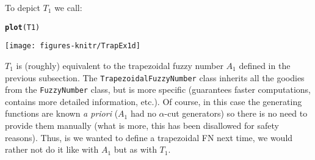 \documentclass[11pt]{article}\usepackage{graphicx, color}
\makeatletter
\newcommand{\hlfunctioncall}[1]{\textcolor[rgb]{0.501960784313725,0,0.329411764705882}{\textbf{#1}}}%
\newenvironment{kframe}{%
 \def\at@end@of@kframe{}%
 \ifinner\ifhmode%
  \def\at@end@of@kframe{\end{minipage}}%
  \begin{minipage}{\columnwidth}%
 \fi\fi%
 \def\FrameCommand##1{\hskip\@totalleftmargin \hskip-\fboxsep
 \colorbox{shadecolor}{##1}\hskip-\fboxsep
     \hskip-\linewidth \hskip-\@totalleftmargin \hskip\columnwidth}%
 \MakeFramed {\advance\hsize-\width
   \@totalleftmargin\z@ \linewidth\hsize
   \@setminipage}}%
 {\par\unskip\endMakeFramed%
 \at@end@of@kframe}
\newenvironment{knitrout}{}{} %
\makeatother
\begin{document}
\noindent
To depict $T_1$ we call:

\begin{knitrout}\small
{}\color{fgcolor}\begin{kframe}
\begin{alltt}
\hlfunctioncall{plot}(T1)
\end{alltt}
\end{kframe}
\end{knitrout}


\begin{center}
\begin{knitrout}\small
{}\color{fgcolor}

{\centering \texttt{[image: figures-knitr/TrapEx1d]} 

}



\end{knitrout}

\end{center}


\bigskip
$T_1$ is (roughly) equivalent to the trapezoidal fuzzy number $A_1$
defined in the previous subsection.
The \texttt{Trapezo\-idalFuzzyNumber}
class inherits all the goodies from the \texttt{FuzzyNumber} class,
but is more specific (guarantees faster computations,
contains more detailed information, etc.).
Of course, in this case the generating functions are known \textit{a priori}
($A_1$ had no $\alpha$-cut generators)
so there is no need to provide them manually
(what is more, this has been disallowed for safety reasons).
Thus, is we wanted to define a trapezoidal FN next time, we would rather
not do it like with $A_1$ but as with $T_1$.
\end{document}
